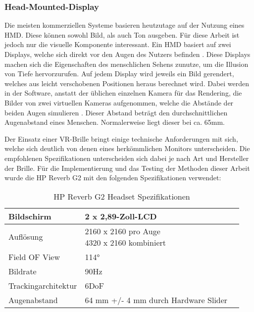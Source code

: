 \subsubsection{Head-Mounted-Display}
Die meisten kommerziellen Systeme basieren heutzutage auf der Nutzung eines HMD.
Diese können sowohl Bild, als auch Ton ausgeben. Für diese Arbeit ist jedoch nur die visuelle Komponente interessant.
Ein HMD basiert auf zwei Displays, welche sich direkt vor den Augen des Nutzers befinden \parencite{Sutherland1968}.
Diese Displays machen sich die Eigenschaften des menschlichen Sehens zunutze, um die Illusion von Tiefe hervorzurufen.
Auf jedem Display wird jeweils ein Bild gerendert, welches aus leicht verschobenen Positionen heraus berechnet wird.
Dabei werden in der Software, anstatt der üblichen einzelnen Kamera für das Rendering, die Bilder von zwei virtuellen Kameras aufgenommen,
welche die Abstände der beiden Augen simulieren \parencite{NVIDIA2010}. Dieser Abstand beträgt den durchschnittlichen
Augenabstand eines Menschen. Normalerweise liegt dieser bei ca. 65mm.

Der Einsatz einer VR-Brille bringt einige technische Anforderungen mit sich, welche sich deutlich
von denen eines herkömmlichen Monitors unterscheiden. Die empfohlenen Spezifikationen unterscheiden sich dabei je nach Art und
Hersteller der Brille. Für die Implementierung und das Testing der Methoden dieser Arbeit wurde die HP Reverb G2 mit den folgenden
Spezifikationen verwendet:


\begin{table}[h]
	\renewcommand*{\arraystretch}{2}
	\setlength{\tabcolsep}{1.5cm}
	\begin{tabular}{lll}
		\hspace{-1.5cm}Bildschirm          & 2 x 2,89-Zoll-LCD                    \\ \hline
		\hspace{-1.5cm}Auflösung           & \makecell[l]{2160 x 2160 pro Auge    \\4320 x 2160 kombiniert}  \\ \hline
		\hspace{-1.5cm}Field OF View       & \raisebox{-0.6ex}{\~{ }}114°         \\ \hline
		\hspace{-1.5cm}Bildrate            & 90Hz                                 \\ \hline
		\hspace{-1.5cm}Trackingarchitektur & 6DoF                                 \\ \hline
		\hspace{-1.5cm}Augenabstand        & 64 mm +/- 4 mm durch Hardware Slider \\ \hline
	\end{tabular}
	\caption[Tabelle 1]{HP Reverb G2 Headset Spezifikationen \parencite{HPG2}}
\end{table}








